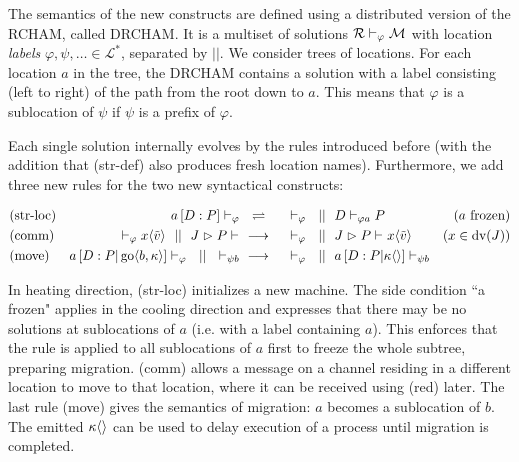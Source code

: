 The semantics of the new constructs are defined using a distributed version
of the RCHAM, called DRCHAM.
It is a multiset of solutions
$ \drchamcnf{\varphi}{\mathcal{R}}{\mathcal{M}} $
with location \emph{labels}
$ \varphi, \psi, \ldots \in \mathcal{L}^* $,
separated by $||$.
We consider trees of locations.
For each location $a$ in the tree,
the DRCHAM contains a solution with a label
consisting (left to right) of the path from the root down to $a$.
This means that $\varphi$ is a sublocation of $\psi$
if $\psi$ is a prefix of $\varphi$.

Each single solution internally evolves by the rules introduced before
(with the addition that (str-def) also produces fresh location names).
Furthermore, we add three new rules for the two new syntactical constructs:

\begin{align*}
  \drchamequ{str-loc}{(a \ \text{frozen)}}{
    \drchamcnf{\varphi}{\jloc{a}{D}{P}}{}
  }{
    \drchamcnf{\varphi}{}{}
    \drchampar
    \drchamcnf{\varphi a}{D}{P}
  }
  \\
  \drchamred{comm}{(x \in \dv{J})}{
    \drchamcnf{\varphi}{}{\jsnd{x}{\tilde{v}}}
    \drchampar
    \drchamcnf{}{\jrct{J}{P}}{}
  }{
    \drchamcnf{\varphi}{}{}
    \drchampar
    \drchamcnf{}{\jrct{J}{P}}{\jsnd{x}{\tilde{v}}}
  }
  \\
  \drchamred{move}{}{
    \drchamcnf{\varphi}{\jloc{a}{D}{P \jpar \jgo{b}{\kappa}}}{}
    \drchampar
    \drchamcnf{\psi b}{}{}
  }{
    \drchamcnf{\varphi}{}{}
    \drchampar
    \drchamcnf{\psi b}{\jloc{a}{D}{P \jpar \jsnd{\kappa}{}}}{}
  }
\end{align*}

In heating direction, (str-loc) initializes a new machine.
The side condition ``a frozen" applies in the cooling direction
and expresses that there may be no solutions at sublocations of $a$
(i.e. with a label containing $a$).
This enforces that the rule is applied to all sublocations of $a$ first
to freeze the whole subtree, preparing migration.
(comm) allows a message on a channel residing in a different location
to move to that location, where it can be received using (red) later.
The last rule (move) gives the semantics of migration: $a$ becomes a sublocation
of $b$. The emitted $\jsnd{\kappa}{}$ can be used to delay execution of a
process until migration is completed.

